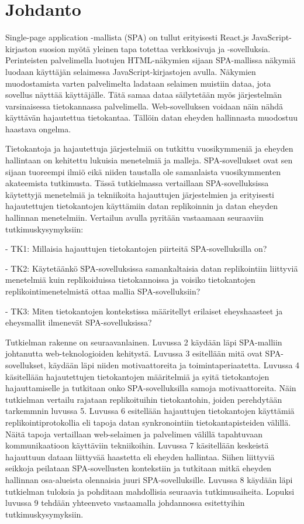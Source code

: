 \documentclass[finnish,twoside,censored,csm,sw-track-2018]{HYthesisML}
\begin{document}
\chapter{Johdanto}

Single-page application -mallista (SPA) on tullut erityisesti React.js JavaScript-kirjaston suosion myötä yleinen tapa totettaa verkkosivuja ja -sovelluksia. Perinteisten palvelimella luotujen HTML-näkymien sijaan SPA-mallissa näkymiä luodaan käyttäjän selaimessa JavaScript-kirjastojen avulla. Näkymien muodostamista varten palvelimelta ladataan selaimen muistiin dataa, jota sovellus näyttää käyttäjälle. Tätä samaa dataa säilytetään myös järjestelmän varsinaisessa tietokannassa palvelimella. Web-sovelluksen voidaan näin nähdä käyttävän hajautettua tietokantaa. Tällöin datan eheyden hallinnasta muodostuu haastava ongelma. 

Tietokantoja ja hajautettuja järjestelmiä on tutkittu vuosikymmeniä ja eheyden hallintaan on kehitettu lukuisia menetelmiä ja malleja. SPA-sovellukset ovat sen sijaan tuoreempi ilmiö eikä niiden taustalla ole samanlaista vuosikymmenten akateemista tutkimusta. Tässä tutkielmassa vertaillaan SPA-sovelluksissa käytettyjä menetelmiä ja tekniikoita hajauttujen järjestelmien ja erityisesti hajautettujen tietokantojen käyttämiin datan replikoinnin ja datan eheyden hallinnan menetelmiin. Vertailun avulla pyritään vastaamaan seuraaviin tutkimuskysymyksiin:

- TK1: Millaisia hajauttujen tietokantojen piirteitä SPA-sovelluksilla on?

- TK2: Käytetäänkö SPA-sovelluksissa samankaltaisia datan replikointiin liittyviä menetelmiä kuin replikoiduissa tietokannoissa ja voisiko tietokantojen replikointimenetelmistä ottaa mallia SPA-sovelluksiin?

- TK3: Miten tietokantojen kontekstissa määritellyt erilaiset eheyshaasteet ja eheysmallit ilmenevät SPA-sovelluksissa?

Tutkielman rakenne on seuraavanlainen. Luvussa 2 käydään läpi SPA-malliin johtanutta web-teknologioiden kehitystä. Luvussa 3 esitellään mitä ovat SPA-sovellukset, käydään läpi niiden motivaattoreita ja toimintaperiaatetta. Luvussa 4 käsitellään hajautettujen tietokantojen määritelmiä ja syitä tietokantojen hajauttamiselle ja tutkitaan onko SPA-sovelluksilla samoja motivaattoreita. Näin tutkielman vertailu rajataan replikoituihin tietokantohin, joiden perehdytään tarkemmnin luvussa 5. Luvussa 6 esitellään hajauttujen tietokantojen käyttämiä replikointiprotokollia eli tapoja datan synkronointiin tietokantapisteiden välillä. Näitä tapoja vertaillaan web-selaimen ja palvelimen välillä tapahtuvaan kommunikaatioon käyttäviin tekniikoihin. Luvussa 7 käsitellään keskeistä hajauttuun dataan liittyvää haastetta eli eheyden hallintaa. Siihen liittyviä seikkoja peilataan SPA-sovellusten kontekstiin ja tutkitaan mitkä eheyden hallinnan osa-alueista olennaisia juuri SPA-sovelluksille. Luvussa 8 käydään läpi tutkielman tuloksia ja pohditaan mahdollisia seuraavia tutkimusaiheita. Lopuksi luvussa 9 tehdään yhteenveto vastaamalla johdannossa esitettyihin tutkimuskysymyksiin.
\end{document}
